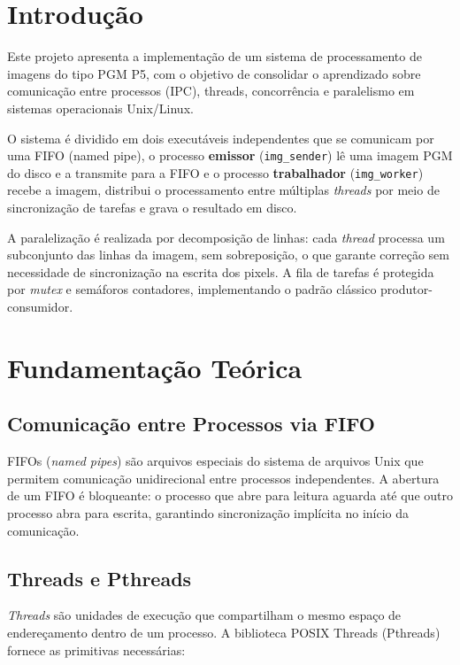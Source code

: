 \documentclass[12 pt]{abntex2}
\begin{document}
\imprimirfolhaderosto

\tableofcontents*
\clearpage

\section{Introdução}

Este projeto apresenta a implementação de um sistema de processamento de
imagens do tipo PGM P5, com o objetivo de consolidar o aprendizado sobre
comunicação entre processos (IPC), threads, concorrência e
paralelismo em sistemas operacionais Unix/Linux.
 
O sistema é dividido em dois executáveis independentes que se comunicam por
uma FIFO (named pipe), o processo \textbf{emissor} (\texttt{img\_sender}) lê uma
imagem PGM do disco e a transmite para a FIFO e o processo \textbf{trabalhador}
(\texttt{img\_worker}) recebe a imagem, distribui o processamento entre
múltiplas \textit{threads} por meio de sincronização de tarefas e grava o resultado em disco.
 
A paralelização é realizada por decomposição de linhas: cada \textit{thread}
processa um subconjunto das linhas da imagem, sem sobreposição, o que garante
correção sem necessidade de sincronização na escrita dos pixels. A fila de
tarefas é protegida por \textit{mutex} e semáforos contadores, implementando
o padrão clássico produtor-consumidor.

\section{Fundamentação Teórica}
 
\subsection{Comunicação entre Processos via FIFO}
 
FIFOs (\textit{named pipes}) são arquivos especiais do sistema de arquivos
Unix que permitem comunicação unidirecional entre processos independentes. A
abertura de um FIFO é bloqueante: o processo que abre para leitura aguarda
até que outro processo abra para escrita, garantindo sincronização implícita
no início da comunicação.
 
\subsection{Threads e Pthreads}
 
\textit{Threads} são unidades de execução que compartilham o mesmo espaço de
endereçamento dentro de um processo. A biblioteca POSIX Threads (Pthreads)
fornece as primitivas necessárias:
 
\end{document}
